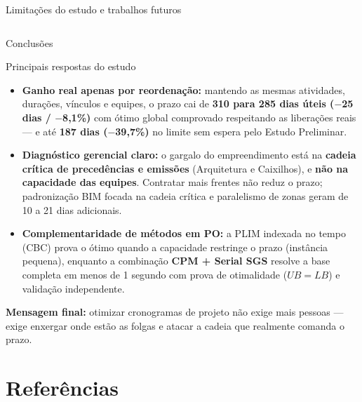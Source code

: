 \documentclass[aspectratio=169]{beamer}
\begin{document}
\begin{frame}{Limitações do estudo e trabalhos futuros}
\begin{columns}[T,onlytextwidth]
\end{columns}

\end{frame}

\begin{frame}{Conclusões}

\begin{block}{Principais respostas do estudo}
\footnotesize
\begin{itemize}
    \setlength{\itemsep}{0.18cm}
    \item \textbf{Ganho real apenas por reordenação:} mantendo as mesmas atividades, durações, vínculos e equipes, o prazo cai de \textbf{310 para 285 dias úteis ($-$25 dias / $-$8,1\%)} com ótimo global comprovado respeitando as liberações reais --- e até \textbf{187 dias ($-$39,7\%)} no limite sem espera pelo Estudo Preliminar.
    \item \textbf{Diagnóstico gerencial claro:} o gargalo do empreendimento está na \textbf{cadeia crítica de precedências e emissões} (Arquitetura e Caixilhos), e \textbf{não na capacidade das equipes}. Contratar mais frentes não reduz o prazo; padronização BIM focada na cadeia crítica e paralelismo de zonas geram de 10 a 21 dias adicionais.
    \item \textbf{Complementaridade de métodos em PO:} a PLIM indexada no tempo (CBC) prova o ótimo quando a capacidade restringe o prazo (instância pequena), enquanto a combinação \textbf{CPM + Serial SGS} resolve a base completa em menos de 1 segundo com prova de otimalidade ($UB = LB$) e validação independente.
\end{itemize}
\end{block}

\vfill

\begin{center}
    \small\textbf{Mensagem final:} otimizar cronogramas de projeto não exige mais pessoas --- exige enxergar onde estão as folgas e atacar a cadeia que realmente comanda o prazo.
\end{center}

\end{frame}

\section{Referências}
\end{document}
